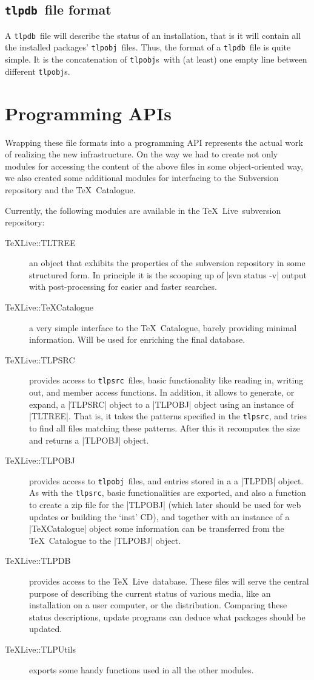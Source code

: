\documentclass{arstexnica}
\newcommand{\tl}{\TeX~Live}
\newcommand{\tlpsrc}{\texttt{tlpsrc}}
\newcommand{\tlpobj}{\texttt{tlpobj}}
\newcommand{\tlpobjs}{\tlpobj{}s}
\newcommand{\tlpdb}{\texttt{tlpdb}}
\begin{document}
\begin{article}
\subsection{\tlpdb\ file format}
\label{sec:tlpdb}

A \tlpdb\ file will describe the status of an installation, that is it
will contain all the installed packages' \tlpobj\ files. Thus,
the format of a \tlpdb\ file is quite simple. It is the concatenation
of \tlpobjs\ with (at least) one empty line between different
\tlpobjs. 


\section{Programming APIs}

Wrapping these file formats into a programming API represents
the actual work of realizing the new infrastructure. On the way we had
to create not only modules for accessing the content of the above
files in some object-oriented way, we also created some additional
modules for interfacing to the Subversion repository and the \TeX\
Catalogue. 

Currently, the following modules are available in the \tl\ subversion
repository:
\begin{description}
\item[TeXLive::TLTREE] an object that exhibits the properties of the
  subversion repository in some structured form. In principle it is
  the scooping up of |svn status -v| output with post-processing
  for easier and faster searches.
\item[TeXLive::TeXCatalogue] a very simple interface to the \TeX\
  Catalogue, barely providing minimal information. Will be used for
  enriching the final database.
\item[TeXLive::TLPSRC] provides access to \tlpsrc\ files, basic
  functionality like reading in, writing out, and member access
  functions. In addition, it allows to generate, or expand, a |TLPSRC|
  object to a |TLPOBJ| object using an instance of |TLTREE|. That is,
  it takes the patterns specified in the \tlpsrc, and tries to find
  all files matching these patterns. After this it recomputes the size
  and returns a |TLPOBJ| object.
\item[TeXLive::TLPOBJ] provides access to \tlpobj\ files, and entries
  stored in a a |TLPDB| object. As with the \tlpsrc, basic
  functionalities are exported, and also a function to create a zip
  file for the |TLPOBJ| (which later should be used for web updates or
  building the `inst' CD),
  and together with an instance of a |TeXCatalogue| object some
  information can be transferred from the \TeX\ Catalogue to the
  |TLPOBJ| object.
\item[TeXLive::TLPDB] provides access to the \tl\ database. These
  files will serve the central purpose of describing the current
  status of various media, like an installation on a user computer, or
  the distribution. Comparing these status descriptions, update
  programs can deduce what packages should be updated.
\item[TeXLive::TLPUtils] exports some handy functions used in all the
  other modules.
\end{description}


\end{article}
\end{document}
